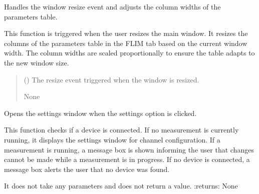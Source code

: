 \documentclass[letterpaper,10pt,english]{sphinxmanual}
\begin{document}
\begin{fulllineitems}
\begin{fulllineitems}
\label{\detokenize{main:main.MainWindow.resizeEvent}}
\pysigstartsignatures
{}
\pysigstopsignatures
\sphinxAtStartPar
Handles the window resize event and adjusts the column widths of the parameters table.

\sphinxAtStartPar
This function is triggered when the user resizes the main window. It resizes the columns 
of the parameters table in the FLIM tab based on the current window width. The column 
widths are scaled proportionally to ensure the table adapts to the new window size.
\begin{quote}\begin{description}
\sphinxAtStartPar
{} () \textendash{} The resize event triggered when the window is resized.

\sphinxAtStartPar
None

\end{description}\end{quote}

\end{fulllineitems}


\begin{fulllineitems}
\label{\detokenize{main:main.MainWindow.settings_clicked}}
\pysigstartsignatures
{}
\pysigstopsignatures
\sphinxAtStartPar
Opens the settings window when the settings option is clicked.

\sphinxAtStartPar
This function checks if a device is connected. If no measurement is currently running, 
it displays the settings window for channel configuration. If a measurement is running, 
a message box is shown informing the user that changes cannot be made while a measurement 
is in progress. If no device is connected, a message box alerts the user that no device 
was found.

\sphinxAtStartPar
It does not take any parameters and does not return a value.
:returns: None

\end{fulllineitems}


\begin{fulllineitems}
\label{\detokenize{main:main.MainWindow.staticMetaObject}}
\pysigstartsignatures
{}
\pysigstopsignatures
\end{fulllineitems}


\end{fulllineitems}
\end{document}

